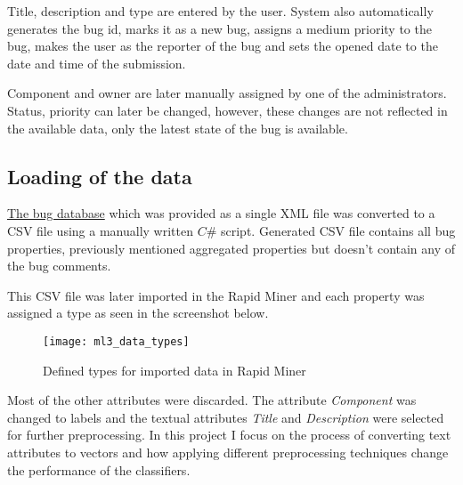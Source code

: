 Title, description and type are entered by the user. System also automatically generates the bug id, marks it as a new bug, assigns a medium priority to the bug, makes the user as the reporter of the bug and sets the opened date to the date and time of the submission.

Component and owner are later manually assigned by one of the administrators. Status, priority can later be changed, however, these changes are not reflected in the available data, only the latest state of the bug is available.

\subsection*{Loading of the data} %

\href{http://2012.msrconf.org/challenge_data/android_platform_bugs.rar}{The bug database}
which was provided as a single XML file was converted to a CSV file using a manually written $C\#$ script. Generated CSV file contains all bug properties, previously mentioned aggregated properties but doesn't contain any of the bug comments.

This CSV file was later imported in the Rapid Miner and each property was assigned a type as seen in the screenshot below.

\begin{figure}
\begin{center}
\texttt{[image: ml3\_data\_types]}
\caption{Defined types for imported data in Rapid Miner}
\end{center}
\end{figure}

Most of the other attributes were discarded. The attribute {\it Component} was changed to labels and the textual attributes {\it Title} and {\it Description} were selected for further preprocessing. 
In this project I focus on the process of converting text attributes to vectors and how applying different preprocessing techniques change the performance of the classifiers.

